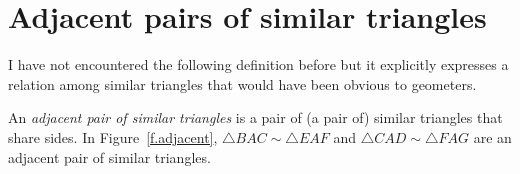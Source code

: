 
%
%
%
%
%
%
%
%

\section{Adjacent pairs of similar triangles}

I have not encountered the following definition before but it explicitly expresses a relation among similar triangles that would have been obvious to geometers.

\begin{definition}
An \emph{adjacent pair of similar triangles} is a pair of (a pair of) similar triangles that share sides. In Figure~\ref{f.adjacent}, $\triangle BAC\sim \triangle EAF$ and $\triangle CAD\sim \triangle FAG$ are an adjacent pair of similar triangles.
\end{definition}


